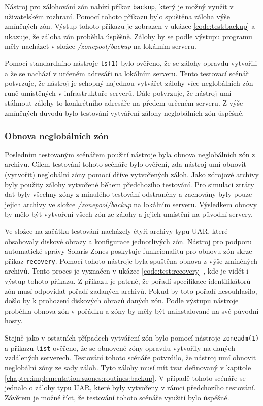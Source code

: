 Nástroj pro zálohování zón nabízí příkaz \verb|backup|, který je možný využít v uživatelském rozhraní. Pomocí tohoto příkazu bylo
spuštěna záloha výše zmíněných zón. Výstup tohoto příkazu je zobrazen v ukázce \ref{code:test:backup} a ukazuje, že záloha
zón proběhla úspěšně. Zálohy by se podle výstupu programu měly nacházet v složce \textit{/zonepool/backup} na lokálním serveru.

Pomocí standardního nástroje \verb|ls(1)| bylo ověřeno, že se zálohy opravdu vytvořili a že se nachází v určeném adresáři na
lokálním serveru. Tento testovací scénář potvrzuje, že nástroj je schopný najednou vytvářet zálohy více neglobálních zón
runě umístěných v infrastruktuře serverů. Dále potvrzuje, že nástroj umí stáhnout zálohy to konkrétního adresáře na předem
určeném serveru. Z výše zmíněných důvodů bylo testování vytváření zálohy neglobálních zón úspěšné.
\subsubsection{Obnova neglobálních zón}
\label{chapter:testing:scenario:backup_recovery:recovery}
Posledním testovaným scénářem použití nástroje byla obnova neglobálních zón z archivu. Cílem testování tohoto scénáře bylo 
ověření, zda nástroj umí obnovit (vytvořit) neglobální zóny pomocí dříve vytvořených záloh. Jako zdrojové archivy byly použity
zálohy vytvořené během předchozího testování. Pro simulaci ztráty dat byly všechny zóny z minulého testování odstraněny a 
zachovány byly pouze jejich archivy ve složce \textit{/zonepool/backup} na lokálním serveru. Výsledkem obnovy by mělo být
vytvoření všech zón ze zálohy a jejich umístění na původní servery. 

Ve složce  na začátku testování nacházely čtyři archivy typu UAR, které obsahovaly diskové obrazy a konfigurace jednotlivých
zón. Nástroj pro podporu automatické správy Solaris Zones poskytuje funkcionalitu pro obnovu zón skrze příkaz \verb|recovery|.
Pomocí tohoto nástroje byla spuštěna obnova z výše zmíněných archivů. Tento proces je vyznačen v ukázce \ref{code:test:recovery}
, kde je vidět i výstup tohoto příkazu. Z příkazu je patrné, že pořadí specifikace identifikátorů zón musí odpovídat pořadí
zadaných archivů. Pokud by toto pořadí nesouhlasilo, došlo by k prohození diskových obrazů daných zón. Podle výstupu nástroje
proběhla obnova zón v pořádku a zóny by měly být nainstalované na své původní hosty.

Stejně jako v ostatních případech vytváření zón bylo pomocí nástroje \verb|zoneadm(1)| a příkazu \verb|list| ověřeno, že se
obnovené zóny opravdu vytvořily na daných vzdálených serverech. Testování tohoto scénáře potvrdilo, že nástroj umí obnovit
neglobální zóny ze sady záloh. Tyto zálohy musí mít tvar definovaný v kapitole \ref{chapter:implementation:szones:routines:backup}.
V případě tohoto scénáře se jednalo o zálohy typu UAR, které byly vytvořeny v rámci předchozího testování. Závěrem je možné říct,
že testování tohoto scénáře využití bylo úspěšné.
